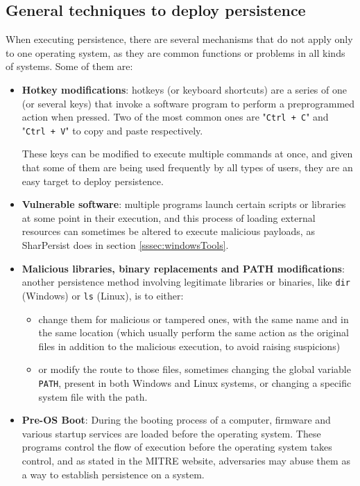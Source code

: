 \bigskip

\subsection{General techniques to deploy persistence}
\label{ssec:persistOthers}
When executing persistence, there are several mechanisms that do not apply only to one operating system, as they are common functions or problems in all kinds of systems. Some of them are: 
\begin{itemize}
\item \textbf{Hotkey modifications}: hotkeys (or keyboard shortcuts) are a series of one (or several keys) that invoke a software program to perform a preprogrammed action when pressed. Two of the most common ones are "\verb|Ctrl + C|" and "\verb|Ctrl + V|" to copy and paste respectively.

These keys can be modified to execute multiple commands at once, and given that some of them are being used frequently by all types of users, they are an easy target to deploy persistence. 

\item \textbf{Vulnerable software}: multiple programs launch certain scripts or libraries at some point in their execution, and this process of loading external resources can sometimes be altered to execute malicious payloads, as SharPersist does in section \ref{sssec:windowsTools}. 

\item \textbf{Malicious libraries, binary replacements and PATH modifications}: another persistence method involving legitimate libraries or binaries, like \texttt{dir} (Windows) or \texttt{ls} (Linux), is to either:
\begin{itemize}
\item change them for malicious or tampered ones, with the same name and in the same location (which usually perform the same action as the original files in addition to the malicious execution, to avoid raising suspicions)
\item or modify the route to those files, sometimes changing the global variable \texttt{PATH}, present in both Windows and Linux systems, or changing a specific system file with the path.
\end{itemize} 

\item \textbf{Pre-OS Boot}: During the booting process of a computer, firmware and various startup services are loaded before the operating system. These programs control the flow of execution before the operating system takes control, and as stated in the MITRE website\cite{MitrePreOS}, adversaries may abuse them as a way to establish persistence on a system.


\end{itemize}

